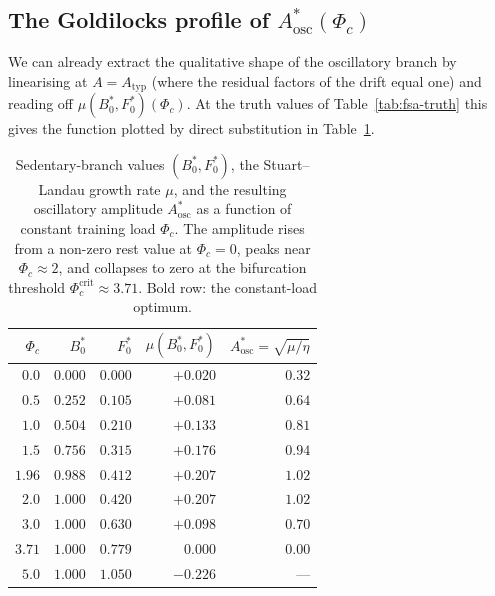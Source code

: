\subsection{The Goldilocks profile of \texorpdfstring{$A^*_{\mathrm{osc}}(\Phi_c)$}{A*\_osc(Phi\_c)}}\label{sec:lyap-goldilocks}

We can already extract the qualitative shape of the oscillatory
branch by linearising at $A = A_{\mathrm{typ}}$ (where the residual
factors of the drift equal one) and reading off
$\mu(B^*_0,F^*_0)(\Phi_c)$. At the truth values of
Table~\ref{tab:fsa-truth} this gives the function plotted by direct
substitution in Table~\ref{tab:goldilocks}.

\begin{table}[h]
\centering
\small
\begin{tabular}{@{}rrrrr@{}}
\toprule
$\Phi_c$ & $B^*_0$ & $F^*_0$ & $\mu(B^*_0,F^*_0)$ & $A^*_{\mathrm{osc}}=\sqrt{\mu/\eta}$ \\
\midrule
$0.0$  & $0.000$ & $0.000$ & $+0.020$ & $0.32$ \\
$0.5$  & $0.252$ & $0.105$ & $+0.081$ & $0.64$ \\
$1.0$  & $0.504$ & $0.210$ & $+0.133$ & $0.81$ \\
$1.5$  & $0.756$ & $0.315$ & $+0.176$ & $0.94$ \\
$\mathbf{1.96}$ & $\mathbf{0.988}$ & $\mathbf{0.412}$ & $\mathbf{+0.207}$ & $\mathbf{1.02}$ \\
$2.0$  & $1.000$ & $0.420$ & $+0.207$ & $1.02$ \\
$3.0$  & $1.000$ & $0.630$ & $+0.098$ & $0.70$ \\
$3.71$ & $1.000$ & $0.779$ & $\;\;\,0.000$ & $0.00$ \\
$5.0$  & $1.000$ & $1.050$ & $-0.226$ & --- \\
\bottomrule
\end{tabular}
\caption{Sedentary-branch values $(B^*_0,F^*_0)$, the Stuart--Landau
growth rate $\mu$, and the resulting oscillatory amplitude
$A^*_{\mathrm{osc}}$ as a function of constant training load
$\Phi_c$. The amplitude rises from a non-zero rest value at
$\Phi_c=0$, peaks near $\Phi_c \approx 2$, and collapses to zero at
the bifurcation threshold $\Phi_c^{\mathrm{crit}} \approx 3.71$.
Bold row: the constant-load optimum.}
\label{tab:goldilocks}
\end{table}

